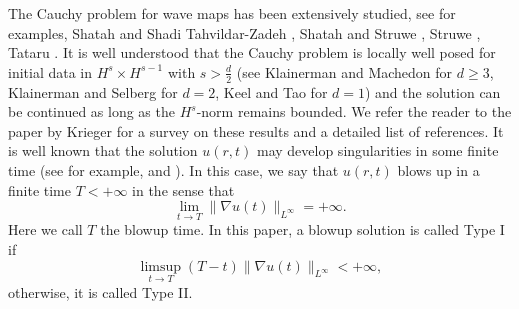 \documentclass[11pt]{aims}
\theoremstyle{definition}
\numberwithin{equation}{section}
\begin{document}
The Cauchy problem  for wave maps has been extensively studied, see for examples, Shatah and Shadi Tahvildar-Zadeh \cite{SScpam94},  Shatah and Struwe \cite{SSbook98, SSimrn02}, Struwe \cite{Sndea97}, Tataru \cite{Tcpde98,Tajm01}. It is well understood that the Cauchy problem is locally well posed for initial data in $H^s \times H^{s - 1}$ with $s > \frac{d}{2}$ (see Klainerman and Machedon \cite{KMdm95} for $d \geq 3$, Klainerman and Selberg \cite{KScpde97} for $d = 2$, Keel and Tao \cite{KTimrn98} for $d = 1$) and the solution can be continued as long as the $H^s$-norm remains bounded.  We refer the reader to the paper by Krieger \cite{Ksdg08} for a survey on these results and a detailed list of references. It is well known that the solution $u(r,t)$ may develop singularities in some finite time (see for example, \cite{CSTihp98} and \cite{Scpam88}). In this case, we say that $u(r,t)$ blows up in a finite time $T < +\infty$ in the sense that 
$$\lim_{t \to T}\|\nabla u(t)\|_{L^\infty} = + \infty.$$
Here we call $T$ the blowup time. In this paper, a blowup solution is called Type I if 
$$\limsup_{t \to T} (T-t)\|\nabla u(t)\|_{L^\infty} < +\infty,$$
otherwise, it is called Type II. \\
\end{document}

